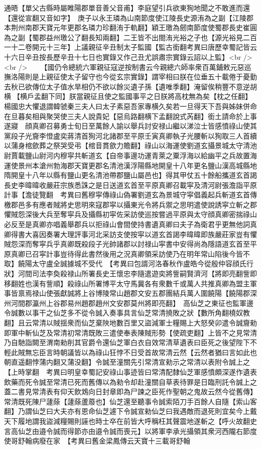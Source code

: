 通晤【單父古縣時屬睢陽郡單音善父音甫】李庭望引兵欲東狥地聞之不敢進而還【還從宣翻又音如字】　庚子以永王璘為山南節度使江陵長史源洧為之副【江陵郡本荆州南郡天寶元年更郡名璘力珍翻洧于軌翻】穎王璬為劒南節度使蜀郡長史崔圓為之副【蜀郡益州璬公了翻長知兩翻】二王皆不出閤洧光裕之子也【源光裕見二百一十二卷開元十三年】上議親征辛丑制太子監國【監古銜翻考異曰唐歷幸蜀記皆云十六日辛丑按長歷辛丑十七日也實錄又作己丑尤誤肅宗實錄云詔以上監】<br />
<br />
　　【國仍令總統六軍親征寇逆按制書云今親總六師率衆百萬鋪敕元惡巡撫洛陽則是上親征使太子留守也今從玄宗實錄】謂宰相曰朕在位垂五十載倦于憂勤去秋已欲傳位太子值水旱相仍不欲以餘災遺子孫【遺唯季翻】淹留俟稍豐不意逆胡横【横戶孟翻下同】朕當親征且使之監國事平之日朕將高枕無為矣【枕之任翻】楊國忠大懼退謂韓虢秦三夫人曰太子素惡吾家專横久矣若一旦得天下吾與姊妹併命在旦暮矣相與聚哭使三夫人說貴妃【惡烏路翻横下孟翻說式芮翻】銜土請命於上事遂寢　顔真卿召募勇士旬日至萬餘人諭以舉兵討安禄山繼以涕泣士皆感憤祿山使其黨段子光齎李憕盧奕蔣清首狥河北諸郡至平原壬寅真卿執子光腰斬以狥取三人首續以蒲身棺歛葬之祭哭受弔【棺音貫歛力贍翻】祿山以海運使劉道玄攝景城太守清池尉賈載鹽山尉河内穆寜共斬道玄【自帝事邊功運青萊之粟浮海以給幽平之兵故置海運使景州本滄州勃海郡天寶更郡名清池漢浮陽縣地開皇十八年更名鹽山漢高城縣地隋開皇十八年以縣有鹽山更名清池帶郡鹽山屬邑也】得其甲仗五十餘船攜道玄首謁長史李暐暐收嚴莊宗族悉誅之是日送道玄首至平原真卿召載寜及清河尉張澹詣平原計事【澹徒覽翻　考異曰舊穆寜傳祿山偽署劉道玄為景城守寜倡義起兵斬道玄首傳檄郡邑多有應者賊將史思明來寇郡寜以攝東光令將兵禦之思明遣使說誘寜立斬之郡懼賊怨深後大兵至奪寜兵及攝縣初寜佐采訪使巡按嘗過平原與太守顔真卿密揣祿山必反至是真卿亦唱義舉郡兵以拒祿山會間使持書遺真卿曰夫子為衛君乎更無他詞真卿得書大喜因奏署大理評事河北采訪支使按寜以道玄首謁李暐暐即族嚴莊家豈有懼賊怨深而奪寜兵乎真卿既殺段子光帥諸郡以討禄山寜書中安得尚為隱語道玄首至平原真卿已召寜計事豈待得此書然後用之況真卿領采訪使乃在明年常山陷後今皆不取】饒陽太守盧全誠據城不受代　【考異曰包諝河洛春秋作盧皓今從殷仲容顔氏行狀】河間司法李奐殺禄山所署長史王懷忠李隨遣遊奕將訾嗣賢濟河【將即亮翻訾即移翻姓也漢有訾順】殺祿山所署博平太守馬冀各有衆數千或萬人共推真卿為盟主軍事皆禀焉禄山使張獻誠將上谷博陵常山趙郡文安五郡團結兵萬人圍饒陽【饒陽郡深州河間郡瀛州上谷郡易州趙郡趙州文安郡莫州將即亮翻】　高仙芝之東征也監軍邊令誠數以事干之仙芝多不從令誠入奏事具言仙芝常清撓敗之狀【數所角翻橈奴教翻】且云常清以賊揺衆而仙芝棄陜地數百里又盜減軍士糧賜上大怒癸卯遣令誠齎勑即軍中斬仙芝及常清初常清既敗三遣使奉表陳賊形勢【使疏吏翻】上皆不之見常清乃自馳詣闕至渭南勑削其官爵令還仙芝軍白衣自效常清草遺表曰臣死之後望陛下不輕此賊無忘臣言時朝議皆以為祿山狂悖不日受首故常清云然【云然者猶曰言如此也朝直遥翻悖蒲内翻又蒲没翻】令誠至潼關先引常清宣勑示之常清以表附令誠上之【上時掌翻　考異曰明皇幸蜀記安祿山事迹皆曰常清配隸仙芝軍感憤頗深遂作遺表飲藥而死令誠至常清已死而舊傳以為勑令却赴潼關自草表待罪是日臨刑託令誠上之蓋二書見常清表有仰天飲鴆向日封章即為尸諫之臣死作聖朝之鬼故云然今從舊傳】常清既死陳尸蘧蒢【蘧蒢蘆䕠也】仙芝還至聽事令誠索陌刀手百餘人自隨【索山客翻】乃謂仙芝曰大夫亦有恩命仙芝遽下令誠宣勑仙芝曰我遇敵而退死則宜矣今上戴天下履地謂我盜減糧賜則誣也時士卒在前皆大呼稱枉其聲震地遂斬之【呼火故翻史言高仙芝由邉令誠而得節亦由邉令誠而喪元】以將軍李承光攝領其衆河西隴右節度使哥舒翰病廢在家　【考異曰舊金梁鳳傳云天寶十三載哥舒翰